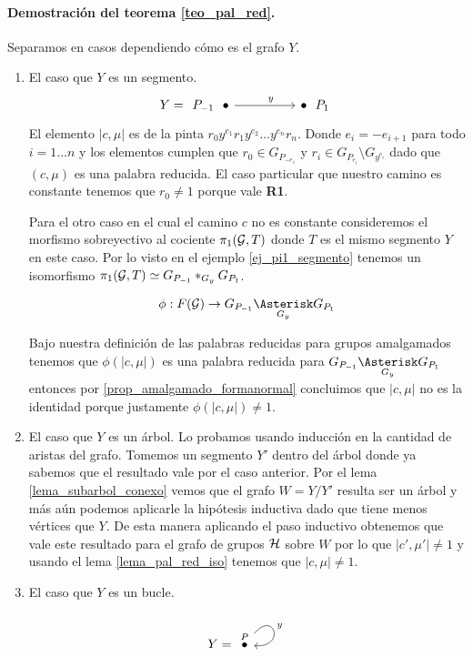 \documentclass[tesis.tex]{subfiles}
\begin{document}
\paragraph{Demostración del teorema \ref{teo_pal_red}.}
Separamos en casos dependiendo cómo es el grafo $Y$.
	\begin{enumerate}
		\item El caso que $Y$ es un segmento.
		\[Y =  \begin{tikzcd}
			{P_{-1} \ \ \bullet} && {\bullet \ \ P_1}
			\arrow["y"{pos=0.6}, from=1-1, to=1-3]
		\end{tikzcd}\]
		El elemento $|c, \mu|$ es de la pinta $r_0y^{e_1}r_1y^{e_2}\dots y^{e_n}r_n$.
		Donde $e_{i} = -e_{i+1}$ para todo $i=1 \dots n$ y los elementos cumplen que $r_0 \in G_{P_{-e_1}}$ y $r_i \in G_{P_{e_i}} \setminus G_{y^{e_i}}$ dado que $(c, \mu)$ es una palabra reducida.
		El caso particular que nuestro camino es constante tenemos que $r_0 \neq 1$ porque vale \textbf{R1}.
		
		Para el otro caso en el cual  el camino $c$ no es constante consideremos el morfismo sobreyectivo al cociente $\pi_1({\cal G},T)$ donde $T$ es el mismo segmento $Y$ en este caso.
		Por lo visto en el ejemplo \ref{ej_pi1_segmento} tenemos un isomorfismo $\pi_1({\cal G}, T) \simeq G_{P_{-1}} \ast_{G_y} G_{P_1}$. 
		
		\[
			\phi: F(\cG) \to G_{P_{-1}} \underset{G_y}{\Asterisk} G_{P_1}
		\]
		
		Bajo nuestra definición de las palabras reducidas para grupos amalgamados tenemos que $\phi(|c, \mu|)$ es una palabra reducida para $G_{P_{-1}} \underset{G_y}{\Asterisk} G_{P_1}$ entonces por \ref{prop_amalgamado_formanormal} concluimos que $|c, \mu|$ no es la identidad porque justamente $\phi(|c,\mu|) \neq 1$.

		
		\item El caso que $Y$ es un árbol. 
		Lo probamos usando inducción en la cantidad de aristas del grafo.
		Tomemos un segmento $Y'$ dentro del árbol donde ya sabemos que el resultado vale por el caso anterior.
		Por el lema \ref{lema_subarbol_conexo} vemos que el grafo $W = Y / Y'$ resulta ser un árbol y más aún podemos aplicarle la hipótesis inductiva dado que tiene menos vértices que $Y$. 
		De esta manera aplicando el paso inductivo obtenemos que vale este resultado para el grafo de grupos ${\cal H}$ sobre $W$ por lo que $|c',\mu'| \neq 1$ y usando el lema \ref{lema_pal_red_iso} tenemos que $|c, \mu| \neq 1$.
		
		\item El caso que $Y$ es un bucle.
		\[
		Y = 	\begin{tikzcd}
			\overset{P}{\bullet} \arrow["y", loop, distance=2.5em, in=355, out=50]
		\end{tikzcd}
		\]
		

\end{enumerate}
\end{document}

